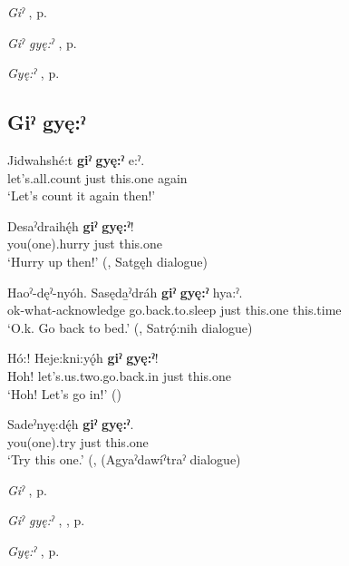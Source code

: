 \begin{CayugaRelated}
\item \textit{Giˀ} , p. \pageref{p:[giˀ]}\\
\item \textit{Giˀ gyę:ˀ} , p. \pageref{p:[giˀ gyę:ˀ] ‘just do it’}\\
\item \textit{Gyę:ˀ} , p. \pageref{p:[gyę:ˀ]}
\end{CayugaRelated}

\subsection*{\textbf{Giˀ gyę:ˀ} } \label{p:[giˀ gyę:ˀ] ‘just do it’}

\ea
\label{ex:gpar75}
\gll Jidwahshé:t \textbf{giˀ} \textbf{gyę:ˀ} e:ˀ.\\
let’s.all.count just this.one again\\
\glt ‘Let’s count it again then!’
\z

\ea
\label{ex:gpar76}
\gll Desaˀdraihę́h \textbf{giˀ} \textbf{gyę:ˀ}!\\
you(one).hurry just this.one\\
\glt ‘Hurry up then!’ (\cite[142]{mithun_watewayestanih_1984}, Satgęh dialogue)
\z

\ea
\label{ex:gpar77}
\gll Haoˀ-dęˀ-nyóh. Sasęda̱ˀdráh \textbf{giˀ} \textbf{gyę:ˀ} hya:ˀ.\\
ok-what-acknowledge go.back.to.sleep just this.one this.time\\
\glt ‘O.k. Go back to bed.’ (\cite[212]{mithun_watewayestanih_1984}, Satrǫ́:nih dialogue)
\z

\ea
\label{ex:gpar78}
\gll Hó:! Heje:kni:yǫ́h \textbf{giˀ} \textbf{gyę:ˀ}!\\
Hoh! let’s.us.two.go.back.in just this.one\\
\glt ‘Hoh! Let’s go in!’ (\cite{henry_de_2005})
\z

\ea
\label{ex:gpar79}
\gll Sadeˀnyę:dę́h \textbf{giˀ} \textbf{gyę:ˀ}.\\
you(one).try just this.one\\
\glt ‘Try this one.’ (\cite[212]{mithun_watewayestanih_1984}, (Agyaˀdawíˀtraˀ dialogue)
\z

\begin{CayugaRelated}
\item \textit{Giˀ} , p. \pageref{p:[giˀ]}\\
\item \textit{Giˀ gyę:ˀ} , , p. \pageref{p:[giˀ gyę:ˀ] ‘quite’}\\
\item \textit{Gyę:ˀ} , p. \pageref{p:[gyę:ˀ]}
\end{CayugaRelated}

